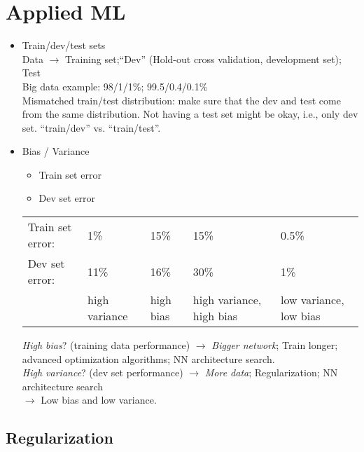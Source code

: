 \section{Applied ML}
\label{sec:AppliedML}

\begin{itemize}
\item
    Train/dev/test sets\\
    Data $\rightarrow$ Training set;``Dev'' (Hold-out cross validation, development set); Test\\
    Big data example: 98/1/1\%; 99.5/0.4/0.1\%\\
    Mismatched train/test distribution: make sure that the dev and test come from the same distribution. Not having a test set might be okay, i.e., only dev set. ``train/dev'' vs. ``train/test''.
\item
    Bias / Variance
    \begin{itemize}
    \item
    Train set error
    \item
    Dev set error
    \end{itemize}    
    \begin{center}
    \begin{tabular}{| m{3cm} | m{2.5cm} | m{2cm} | m{2.5cm} | m{2.5cm} | }
    \hline
    Train set error: & 1\%   & 15\% & 15\% & 0.5\%\\
    Dev set error:   & 11\% & 16\% & 30\% & 1\%\\
    			    & high variance & high bias &  high variance, high bias & low variance, low bias\\
    \hline
    \end{tabular}
    \end{center}
    \emph{High bias}? (training data performance) $\rightarrow$ \emph{Bigger network}; Train longer; advanced optimization algorithms; NN architecture search.\\
    \emph{High variance}? (dev set performance) $\rightarrow$ \emph{More data}; Regularization; NN architecture search\\
    \indent $\rightarrow$ Low bias and low variance.
\end{itemize}

%
\subsection{Regularization}
    
